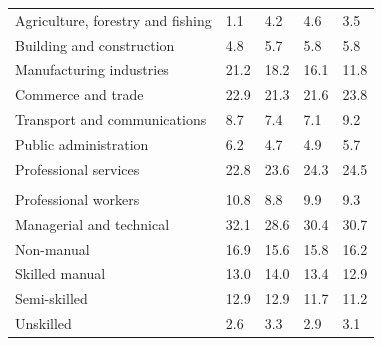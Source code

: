 \documentclass{article}
\begin{document}
\begin{table}[h]
\begin{tabular}{KTTTT}
    \hline
Agriculture, forestry and fishing  & 1.1& 4.2& 4.6& 3.5\\
Building and construction & 4.8& 5.7& 5.8& 5.8\\
Manufacturing industries & 21.2& 18.2& 16.1& 11.8\\
Commerce and trade  & 22.9& 21.3& 21.6& 23.8\\
Transport and communications  & 8.7& 7.4& 7.1& 9.2\\
Public administration & 6.2& 4.7& 4.9& 5.7\\
Professional services & 22.8& 23.6& 24.3& 24.5\\
\hline
    \\ 
    \hline
Professional workers  & 10.8&  8.8 &  9.9&  9.3\\
Managerial and technical & 32.1& 28.6& 30.4& 30.7\\
Non-manual & 16.9& 15.6& 15.8& 16.2\\
Skilled manual & 13.0& 14.0& 13.4& 12.9\\
Semi-skilled & 12.9& 12.9& 11.7& 11.2\\
Unskilled  & 2.6& 3.3& 2.9& 3.1\\
\end{tabular}
\end{table}
\pagebreak
\end{document}
